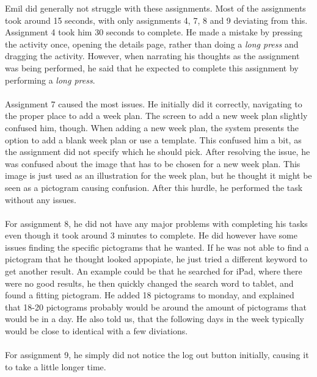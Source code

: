 \noindent
Emil did generally not struggle with these assignments.
Most of the assignments took around 15 seconds, with only assignments 4, 7, 8 and 9 deviating from this.
\\
Assignment 4 took him 30 seconds to complete.
He made a mistake by pressing the activity once, opening the details page, rather than doing a \textit{long press} and dragging the activity.
However, when narrating his thoughts as the assignment was being performed, he said that he expected to complete this assignment by performing a \textit{long press}.
\\\\
Assignment 7 caused the most issues. 
He initially did it correctly, navigating to the proper place to add a week plan. 
The screen to add a new week plan slightly confused him, though.
When adding a new week plan, the system presents the option to add a blank week plan or use a template.
This confused him a bit, as the assignment did not specify which he should pick.
After resolving the issue, he was confused about the image that has to be chosen for a new week plan.
This image is just used as an illustration for the week plan, but he thought it might be seen as a pictogram causing confusion.
After this hurdle, he performed the task without any issues.
\\\\
For assignment 8, he did not have any major problems with completing his tasks even though it took around 3 minutes to complete.
He did however have some issues finding the specific pictograms that he wanted.
If he was not able to find a pictogram that he thought looked appopiate, he just tried a different keyword to get another result. 
An example could be that he searched for iPad, where there were no good results, he then quickly changed the search word to tablet, and found a fitting pictogram.
He added 18 pictograms to monday, and explained that 18-20 pictograms probably would be around the amount of pictograms that would be in a day.
He also told us, that the following days in the week typically would be close to identical with a few diviations.
\\\\
For assignment 9, he simply did not notice the log out button initially, causing it to take a little longer time.

